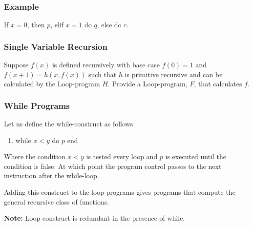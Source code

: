 \documentclass{beamer}
\theoremstyle{indentDefn} \newtheorem{defn}[]{Definition}
\begin{document}
\begin{frame}
	\frametitle{Example}

	If $x = 0$, then $p$, elif $x = 1$ do $q$, else do $r$. 
	


	\vspace{7cm}

	
\end{frame}


\begin{frame}
	\frametitle{Single Variable Recursion}

	Suppose $f(x)$ is defined recursively with base case $f(0) = 1$ and $f(x+1) = h(x,f(x))$ such that $h$ is primitive recursive and can be calculated by the Loop-program $H$. Provide a Loop-program, $F$, that calculates $f$. 

	\vspace{6cm}

\end{frame}

\begin{frame}
	\frametitle{While Programs}

	Let us define the while-construct as follows

	\begin{enumerate}
		\item[] while $x < y$ do $p$ end
	\end{enumerate}

	Where the condition $x < y$ is tested every loop and $p$ is executed until the condition is false. At which point the program control passes to the next instruction after the while-loop.

	\vspace{0.5cm}

	Adding this construct to the loop-programs gives programs that compute the general recursive class of functions. 

	\vspace{0.5cm}

	{\bf Note:} Loop construct is redundant in the presence of while.
	\vspace{3cm}


\end{frame}
\end{document}
